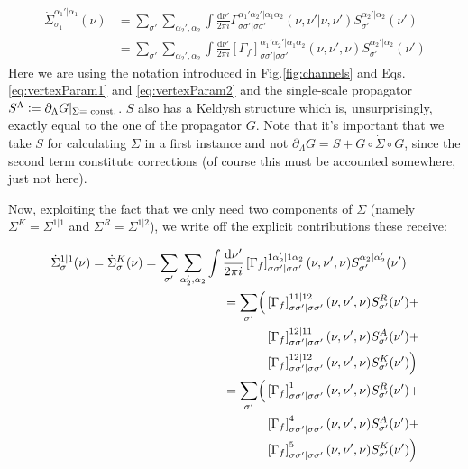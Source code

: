 \documentclass[12pt,a4paper,roman]{article}
\newcommand{\defeq}{\vcentcolon=}
\newcommand{\dd}{\mathrm{d}}
\begin{document}
\begin{align}
\dot{\Sigma}^{\alpha_1'|\alpha_1}_{\sigma_1}(\nu) &= \sum_{\sigma'} \sum_{\alpha_2', \alpha_2} \int \frac{\dd\nu'}{2\pi i}  \Gamma_{\sigma\sigma'|\sigma\sigma'}^{\alpha_1'\alpha_2'|\alpha_1\alpha_2}(\nu, \nu'| \nu, \nu')S^{\alpha_2'|\alpha_2}_{\sigma'}(\nu')\\
&= \sum_{\sigma'} \sum_{\alpha_2', \alpha_2} \int \frac{\dd\nu'}{2\pi i}  \left[\Gamma_f\right]_{\sigma\sigma'|\sigma\sigma'}^{\alpha_1'\alpha_2'|\alpha_1\alpha_2}(\nu, \nu', \nu)S^{\alpha_2'|\alpha_2}_{\sigma'}(\nu')
\label{eq:derivativeSelfEnergy}
\end{align}
Here we are using the notation introduced in Fig.\ref{fig:channels} and Eqs.\eqref{eq:vertexParam1} and \eqref{eq:vertexParam2} and the single-scale propagator $S^\Lambda \defeq \partial_\Lambda G|_{\Sigma =\text{ const.}}$. $S$ also has a Keldysh structure which is, unsurprisingly, exactly equal to the one of the propagator $G$. Note that it's important that we take $S$ for calculating $\Sigma$ in a first instance and not $\partial_\Lambda G = S + G\circ \dot{\Sigma}\circ G$, since the second term constitute corrections (of course this must be accounted somewhere, just not here).

Now, exploiting the fact that we only need two components of $\Sigma$ (namely $\Sigma^K=\Sigma^{1|1}$ and $\Sigma^R=\Sigma^{1|2}$), we write off the explicit contributions these receive:

\begin{align}
\begin{split}
\dot{\Sigma}^{1|1}_\sigma(\nu) =\dot{\Sigma}^K_\sigma(\nu) = \sum_{\sigma'}&\sum_{\alpha_2', \alpha_2}\int \frac{\dd\nu'}{2\pi i} \left[\Gamma_f\right]_{\sigma\sigma'|\sigma\sigma'}^{1\alpha_2'|1\alpha_2}(\nu, \nu', \nu)S^{\alpha_2|\alpha_2'}_{\sigma'}(\nu')
\end{split}\\
\begin{split}
= \sum_{\sigma'} \Bigl(
&\left[\Gamma_f\right]_{\sigma\sigma'|\sigma\sigma'}^{11|12}(\nu, \nu', \nu)S^R_{\sigma'}(\nu') +\\
&\left[\Gamma_f\right]_{\sigma\sigma'|\sigma\sigma'}^{12|11}(\nu, \nu', \nu)S^A_{\sigma'}(\nu') +\\
& \left[\Gamma_f\right]_{\sigma\sigma'|\sigma\sigma'}^{12|12}(\nu, \nu', \nu)S^K_{\sigma'}(\nu')\Bigr)
\end{split}\\
\begin{split}
= \sum_{\sigma'} \Bigl(
&\left[\Gamma_f\right]_{\sigma\sigma'|\sigma\sigma'}^{1}(\nu, \nu', \nu)S^R_{\sigma'}(\nu') +\\
&\left[\Gamma_f\right]_{\sigma\sigma'|\sigma\sigma'}^{4}(\nu, \nu', \nu)S^A_{\sigma'}(\nu') +\\
& \left[\Gamma_f\right]_{\sigma\sigma'|\sigma\sigma'}^{5}(\nu, \nu', \nu)S^K_{\sigma'}(\nu')\Bigr)
\label{eq:SigmaK}
\end{split}
\end{align}
\end{document}
